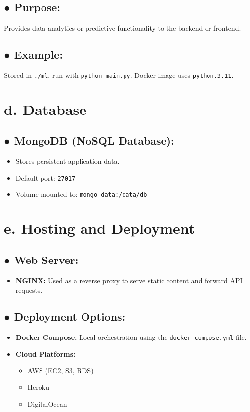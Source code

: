 \documentclass[12pt]{article}
\begin{document}
\subsection*{● Purpose:}
Provides data analytics or predictive functionality to the backend or frontend.

\subsection*{● Example:}
Stored in \texttt{./ml}, run with \texttt{python main.py}. Docker image uses \texttt{python:3.11}.

\section*{d. Database}

\subsection*{● MongoDB (NoSQL Database):}
\begin{itemize}
  \item Stores persistent application data.
  \item Default port: \texttt{27017}
  \item Volume mounted to: \texttt{mongo-data:/data/db}
\end{itemize}

\section*{e. Hosting and Deployment}

\subsection*{● Web Server:}
\begin{itemize}
  \item \textbf{NGINX:} Used as a reverse proxy to serve static content and forward API requests.
\end{itemize}

\subsection*{● Deployment Options:}
\begin{itemize}
  \item \textbf{Docker Compose:} Local orchestration using the \texttt{docker-compose.yml} file.
  \item \textbf{Cloud Platforms:}
  \begin{itemize}
    \item AWS (EC2, S3, RDS)
    \item Heroku
    \item DigitalOcean
  \end{itemize}
\end{itemize}
\end{document}
